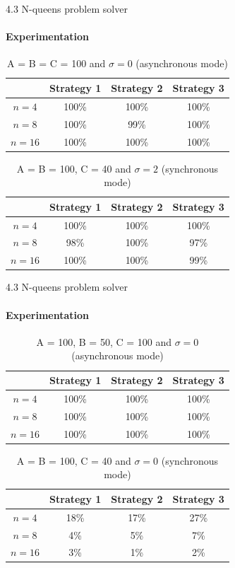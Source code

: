 \documentclass[11pt, aspectratio=169]{beamer}
\begin{document}
\begin{frame}{4.3 N-queens problem solver}
\framesubtitle{Experimentation}
\begin{table}
    \centering
    \begin{tabular}{|c|c|c|c|}
        \hline
        & Strategy 1 & Strategy 2 & Strategy 3 \\
        \hline
        \( n = 4 \) & 100\% & 100\% & 100\% \\
        \( n = 8 \) & 100\% & 99\% & 100\% \\
        \( n = 16 \) & 100\% & 100\% & 100\% \\
        \hline
    \end{tabular}
    \caption{A = B = C = 100 and \(\sigma = 0\) (asynchronous mode)}
\end{table}

\begin{table}
    \centering
    \begin{tabular}{|c|c|c|c|}
        \hline
        & Strategy 1 & Strategy 2 & Strategy 3 \\
        \hline
        \( n = 4 \) & 100\% & 100\% & 100\% \\
        \( n = 8 \) & 98\% & 100\% & 97\% \\
        \( n = 16 \) & 100\% & 100\% & 99\% \\
        \hline
    \end{tabular}
    \caption{A = B = 100, C = 40 and \(\sigma = 2\) (synchronous mode)}
\end{table}

\end{frame}

\begin{frame}{4.3 N-queens problem solver}
\framesubtitle{Experimentation}
\begin{table}
    \centering
    \begin{tabular}{|c|c|c|c|}
        \hline
        & Strategy 1 & Strategy 2 & Strategy 3 \\
        \hline
        \( n = 4 \) & 100\% & 100\% & 100\% \\
        \( n = 8 \) & 100\% & 100\% & 100\% \\
        \( n = 16 \) & 100\% & 100\% & 100\% \\
        \hline
    \end{tabular}
    \caption{A = 100, B = 50, C = 100 and \(\sigma = 0\) (asynchronous mode)}
\end{table}

\begin{table}
    \centering
    \begin{tabular}{|c|c|c|c|}
        \hline
        & Strategy 1 & Strategy 2 & Strategy 3 \\
        \hline
        \( n = 4 \) & 18\% & 17\% & 27\% \\
        \( n = 8 \) & 4\% & 5\% & 7\% \\
        \( n = 16 \) & 3\% & 1\% & 2\% \\
        \hline
    \end{tabular}
    \caption{A = B = 100, C = 40 and \(\sigma = 0\) (synchronous mode)}
\end{table}
\end{frame}
\end{document}
